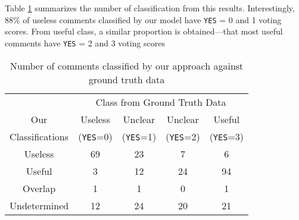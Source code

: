 Table \ref{tb:classify_number} summarizes the number of classification from this results.
Interestingly, 88\% of useless comments classified by our model have \texttt{YES} = 0 and 1 voting scores.
From useful class, a similar proportion is obtained---that most useful comments have \texttt{YES} = 2 and 3 voting scores

\begin{table}[h]
\centering
\small
\caption{Number of comments classified by our approach against ground truth data}
\begin{tabular}{ccccc}
\hline
& \multicolumn{4}{c}{Class from Ground Truth Data} \\ \cline{2-5}
Our&  Useless  & Unclear  & Unclear & Useful \\
Classifications&  (\texttt{YES}=0) & (\texttt{YES}=1) & (\texttt{YES}=2) & (\texttt{YES}=3) \\
\hline \hline
Useless & 69 & 23 & 7 & 6 \\
Useful & 3 & 12 & 24 & 94 \\
Overlap & 1 & 1 & 0 & 1 \\
Undetermined & 12 & 24 & 20 & 21 \\
\hline
\end{tabular}
\label{tb:classify_number}
\end{table}


